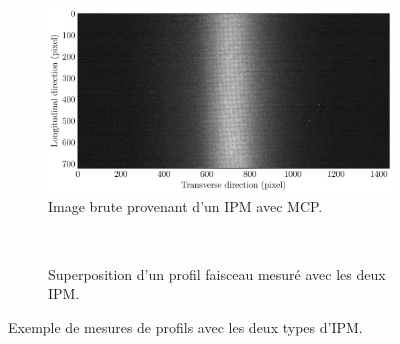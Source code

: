 \begin{figure}[!ht]
	\begin{subfigure}[t]{0.55\textwidth}
		\includegraphics[width=\textwidth]{00_French/figures/fig000_profil_a}
		\caption[]{Image brute provenant d'un IPM avec MCP.}
		\label{sumfr:fig:profil_a}
	\end{subfigure}
	~
	\begin{subfigure}[t]{0.45\textwidth}
		
		\caption[]{Superposition d'un profil faisceau mesuré avec les deux IPM.}
		\label{sumfr:fig:profil_b}
	\end{subfigure}
  \caption[]{Exemple de mesures de profils avec les deux types d'IPM.}
	\label{sumfr:fig:profil}
\end{figure}

